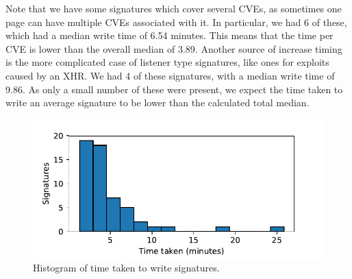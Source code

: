 Note that we have some signatures which cover several CVEs, as sometimes one page can have multiple CVEs associated with it. In particular, we had 6 of these, which had a median write time of 6.54 minutes. This means that the time per CVE is lower than the overall median of 3.89. Another source of increase timing is the more complicated case of listener type signatures, like ones for exploits caused by an XHR. We had 4 of these signatures, with a median write time of 9.86. As only a small number of these were present, we expect the time taken to write an average signature to be lower than the calculated total median.

\begin{figure}[h]
	\begin{center}
	\includegraphics[scale=0.5]{results/signature_times_small.pdf}
	\caption{Histogram of time taken to write signatures.}
	\label{fig:signature_times}
	\end{center}
\end{figure}


